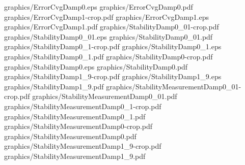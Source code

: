 graphics/ErrorCvgDamp0.eps
graphics/ErrorCvgDamp0.pdf
graphics/ErrorCvgDamp1-crop.pdf
graphics/ErrorCvgDamp1.eps
graphics/ErrorCvgDamp1.pdf
graphics/StabilityDamp0_01-crop.pdf
graphics/StabilityDamp0_01.eps
graphics/StabilityDamp0_01.pdf
graphics/StabilityDamp0_1-crop.pdf
graphics/StabilityDamp0_1.eps
graphics/StabilityDamp0_1.pdf
graphics/StabilityDamp0-crop.pdf
graphics/StabilityDamp0.eps
graphics/StabilityDamp0.pdf
graphics/StabilityDamp1_9-crop.pdf
graphics/StabilityDamp1_9.eps
graphics/StabilityDamp1_9.pdf
graphics/StabilityMeasurementDamp0_01-crop.pdf
graphics/StabilityMeasurementDamp0_01.pdf
graphics/StabilityMeasurementDamp0_1-crop.pdf
graphics/StabilityMeasurementDamp0_1.pdf
graphics/StabilityMeasurementDamp0-crop.pdf
graphics/StabilityMeasurementDamp0.pdf
graphics/StabilityMeasurementDamp1_9-crop.pdf
graphics/StabilityMeasurementDamp1_9.pdf
